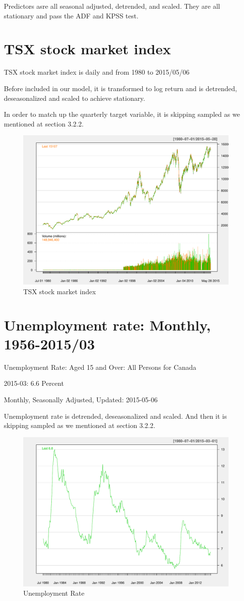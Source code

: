 Predictors asre all seasonal adjusted, detrended, and scaled. They are all stationary and pass the ADF and KPSS test. 


\section{TSX stock market index}


TSX stock market index is daily and from 1980 to 2015/05/06

Before included in our model, it is transformed to log return and is detrended, deseasonalized and scaled to achieve stationary. 

In order to match up the quarterly target variable, it is skipping sampled as we mentioned at section 3.2.2. 

\begin{figure}[h]
\centering
\includegraphics[width=0.7\linewidth]{Figures/tsx-report}
\caption{TSX stock market index}
\label{fig:tsx-report}
\end{figure}


\section{Unemployment rate: Monthly, 1956-2015/03}  


Unemployment Rate: Aged 15 and Over: All Persons for Canada

2015-03: 6.6 Percent

Monthly, Seasonally Adjusted, Updated: 2015-05-06

Unemployment rate is detrended, deseasonalized and scaled. And then it is skipping sampled as we mentioned at section 3.2.2. 

\begin{figure}[h]
\centering
\includegraphics[width=0.7\linewidth]{Figures/labor-report}
\caption{Unemployment Rate}
\label{fig:labor-report}
\end{figure}
 
